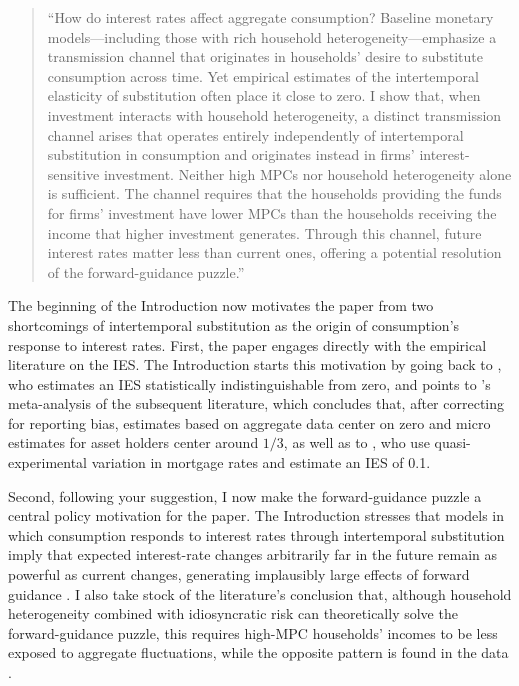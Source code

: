 \documentclass[11pt]{article}
\begin{document}
\begin{enumerate}
\begin{quote}
``How do interest rates affect aggregate consumption? Baseline monetary models---including those with rich household heterogeneity---emphasize a transmission channel that originates in households' desire to substitute consumption across time. Yet empirical estimates of the intertemporal elasticity of substitution often place it close to zero. I show that, when investment interacts with household heterogeneity, a distinct transmission channel arises that operates entirely independently of intertemporal substitution in consumption and originates instead in firms' interest-sensitive investment. Neither high MPCs nor household heterogeneity alone is sufficient. The channel requires that the households providing the funds for firms' investment have lower MPCs than the households receiving the income that higher investment generates. Through this channel, future interest rates matter less than current ones, offering a potential resolution of the forward-guidance puzzle.''
\end{quote}

The beginning of the Introduction now motivates the paper from two shortcomings of intertemporal substitution as the origin of consumption's response to interest rates. First, the paper engages directly with the empirical literature on the IES. The Introduction starts this motivation by going back to \cite{Hall1988}, who estimates an IES statistically indistinguishable from zero, and points to \cite{Havranek2015}'s meta-analysis of the subsequent literature, which concludes that, after correcting for reporting bias, estimates based on aggregate data center on zero and micro estimates for asset holders center around $1/3$, as well as to \cite{Bestetal2020}, who use quasi-experimental variation in mortgage rates and estimate an IES of 0.1.

Second, following your suggestion, I now make the forward-guidance puzzle a central policy motivation for the paper. The Introduction stresses that models in which consumption responds to interest rates through intertemporal substitution imply that expected interest-rate changes arbitrarily far in the future remain as powerful as current changes, generating implausibly large effects of forward guidance \citep{DNGP2023}. I also take stock of the literature's conclusion that, although household heterogeneity combined with idiosyncratic risk can theoretically solve the forward-guidance puzzle, this requires high-MPC households' incomes to be less exposed to aggregate fluctuations, while the opposite pattern is found in the data \citep{Werning2015,Bilbiie2020,Patterson2023}.


\end{enumerate}
\end{document}
